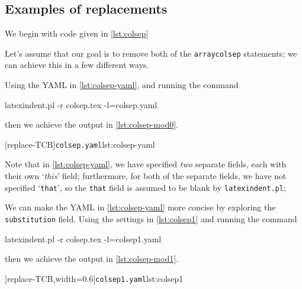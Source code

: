 \documentclass[10pt]{article}
\begin{document}
\subsection{Examples of replacements}
 \begin{example}
 We begin with code given in \cref{lst:colsep}


 Let's assume that our goal is to remove both of the \texttt{arraycolsep} statements; we
 can achieve this in a few different ways.

 Using the YAML in \cref{lst:colsep-yaml}, and running the command  

 \begin{commandshell}
latexindent.pl -r colsep.tex -l=colsep.yaml
\end{commandshell}

 then we achieve the output in \cref{lst:colsep-mod0}.

 \begin{cmhtcbraster}
  [replace-TCB]{\texttt{colsep.yaml}}{lst:colsep-yaml}
 \end{cmhtcbraster}
 Note that in \cref{lst:colsep-yaml}, we have specified \emph{two} separate fields, each
 with their own `\emph{this}' field; furthermore, for both of the separate fields, we
 have not specified `\texttt{that}', so the \texttt{that} field is assumed to be blank by
 \texttt{latexindent.pl};

 We can make the YAML in \cref{lst:colsep-yaml} more concise by exploring the
 \texttt{substitution} field. Using the settings in \cref{lst:colsep1} and running the
 command  

 \begin{commandshell}
latexindent.pl -r colsep.tex -l=colsep1.yaml
\end{commandshell}

 then we achieve the output in \cref{lst:colsep-mod1}.  

 \begin{cmhtcbraster}
  [replace-TCB,width=0.6\textwidth]{\texttt{colsep1.yaml}}{lst:colsep1}
 \end{cmhtcbraster}


\end{example}
\end{document}
